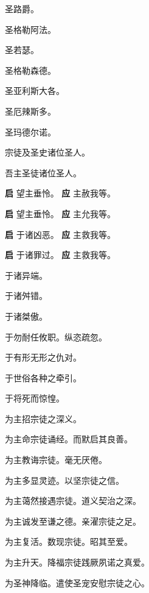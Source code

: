 \documentclass[UTF8,17pt]{ctexart}
\begin{document}
 圣路爵。

 圣格勒阿法。

 圣若瑟。

 圣格勒森德。

 圣亚利斯⼤各。

 圣厄辣斯多。

 圣玛德尔诺。

 宗徒及圣史诸位圣⼈。

 吾主圣徒诸位圣⼈。

\textbf{启} \quad 望主垂怜。 \hfill \textbf{应} \quad 主赦我等。

\textbf{启} \quad 望主垂怜。 \hfill \textbf{应} \quad 主允我等。

\textbf{启} \quad 于诸凶恶。 \hfill \textbf{应} \quad 主救我等。

\textbf{启} \quad 于诸罪过。 \hfill \textbf{应} \quad 主救我等。

 于诸异端。

 于诸⾇错。

 于诸桀傲。

 于勿耐任攸职。纵恣疏忽。

 于有形⽆形之仇对。

 于世俗各种之牵引。

 于将死⽽惊惶。

 为主招宗徒之深义。

 为主命宗徒诵经。⽽默启其良善。

 为主教诲宗徒。毫⽆厌倦。

 为主多显灵迹。以坚宗徒之信。

 为主蔼然接遇宗徒。道义契治之深。

 为主诚发⾄谦之德。亲濯宗徒之⾜。

 为主复活。数现宗徒。昭其⾄爱。

 为主升天。降福宗徒践厥夙诺之真爱。

 为圣神降临。遣使圣宠安慰宗徒之⼼。
\end{document}
